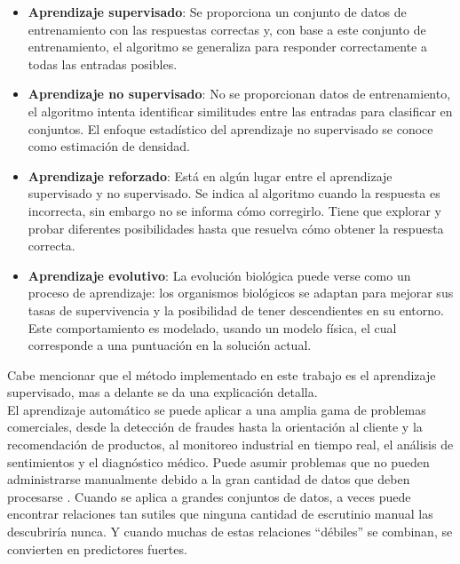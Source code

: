 \begin{itemize}

	\item \textbf{Aprendizaje supervisado}: Se proporciona un conjunto de datos de entrenamiento con las respuestas correctas y, con base a este conjunto de 
	entrenamiento, el algoritmo se generaliza para responder correctamente a todas 
	las entradas posibles.

	\item \textbf{Aprendizaje no supervisado}: No se proporcionan datos de entrenamiento, el algoritmo intenta identificar similitudes entre las entradas para clasificar en conjuntos. El enfoque estadístico del aprendizaje no 
	supervisado se conoce como estimación de densidad.

	\item \textbf{Aprendizaje reforzado}: Está en algún lugar entre el aprendizaje supervisado y no supervisado. Se indica al algoritmo cuando la respuesta es incorrecta, sin embargo no se informa
	cómo corregirlo. Tiene que explorar y probar diferentes posibilidades hasta que resuelva 
	cómo obtener la respuesta correcta.

	\item \textbf{Aprendizaje evolutivo}: La evolución biológica puede verse como un proceso de aprendizaje: los organismos biológicos se adaptan para mejorar sus tasas de supervivencia 
	y la posibilidad de tener descendientes en su entorno. Este comportamiento es modelado, 
	usando un modelo física, el cual corresponde a una puntuación en la 
	solución actual.

\end{itemize}

Cabe mencionar que el método implementado en este trabajo es el aprendizaje supervisado, mas a delante se da una explicación detalla.\\

El aprendizaje automático se puede aplicar a una amplia gama de problemas comerciales, desde la detección de fraudes hasta la orientación al cliente y la recomendación de productos, al monitoreo industrial en tiempo real, el análisis de sentimientos y el diagnóstico médico. Puede asumir problemas que no pueden administrarse manualmente debido a la gran cantidad de datos que deben procesarse \citep{CT22}. Cuando se aplica a grandes conjuntos de datos, a veces puede encontrar relaciones tan sutiles que ninguna cantidad de escrutinio manual las descubriría nunca. Y cuando muchas de estas relaciones ``débiles'' se combinan, se convierten en predictores fuertes.


